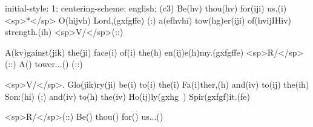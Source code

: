 initial-style: 1;
centering-scheme: english;
(c3) Be(hv) thou(hv) for(iji) us,(i) <sp>*</sp> O(hijvh) Lord,(gxfgffe) (:) a(efhvhi) tow(hg)er(iji) of(hvijIHiv) strength.(ih) <sp>V/</sp>(::)

A(kv)gainst(jik) the(ji) face(i) of(i) the(h) en(ij)e(h)my.(gxfgffe) <sp>R/</sp>(::) A() tower...() (::)

<sp>V/</sp>. Glo(jik)ry(ji) be(i) to(i) the(i) Fa(i)ther,(h) and(iv) to(ij) the(ih) Son:(hi) (;) and(iv) to(h) the(iv) Ho(ij)ly(gxhg~) Spir(gxfgf)it.(fe)

<sp>R/</sp>(::) Be() thou() for() us...()
